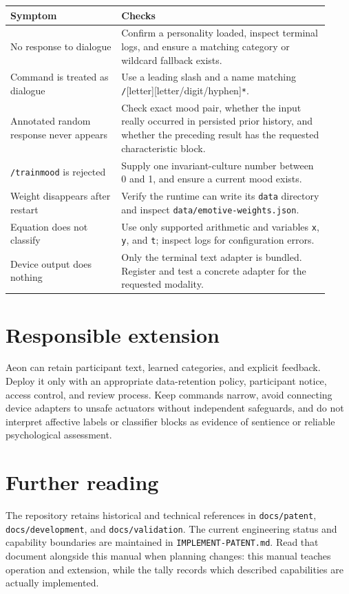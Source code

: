 \documentclass[11pt,a4paper]{article}
\begin{document}
\begin{longtable}{p{0.32\linewidth}p{0.60\linewidth}}
\toprule
Symptom & Checks \\
\midrule
\endhead
No response to dialogue & Confirm a personality loaded, inspect terminal logs, and ensure a matching category or wildcard fallback exists. \\
Command is treated as dialogue & Use a leading slash and a name matching \texttt{/}[letter][letter/digit/hyphen]\texttt{*}. \\
Annotated random response never appears & Check exact mood pair, whether the input really occurred in persisted prior history, and whether the preceding result has the requested characteristic block. \\
\texttt{/trainmood} is rejected & Supply one invariant-culture number between 0 and 1, and ensure a current mood exists. \\
Weight disappears after restart & Verify the runtime can write its \texttt{data} directory and inspect \texttt{data/emotive-weights.json}. \\
Equation does not classify & Use only supported arithmetic and variables \texttt{x}, \texttt{y}, and \texttt{t}; inspect logs for configuration errors. \\
Device output does nothing & Only the terminal text adapter is bundled. Register and test a concrete adapter for the requested modality. \\
\bottomrule
\end{longtable}

\section{Responsible extension}

Aeon can retain participant text, learned categories, and explicit feedback. Deploy it only with an appropriate data-retention policy, participant notice, access control, and review process. Keep commands narrow, avoid connecting device adapters to unsafe actuators without independent safeguards, and do not interpret affective labels or classifier blocks as evidence of sentience or reliable psychological assessment.

\section{Further reading}

The repository retains historical and technical references in \texttt{docs/patent}, \texttt{docs/development}, and \texttt{docs/validation}. The current engineering status and capability boundaries are maintained in \texttt{IMPLEMENT-PATENT.md}. Read that document alongside this manual when planning changes: this manual teaches operation and extension, while the tally records which described capabilities are actually implemented.
\end{document}
